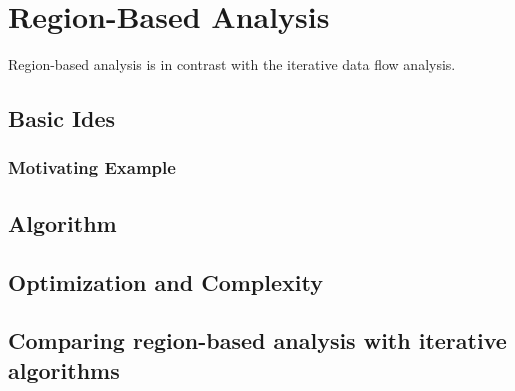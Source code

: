 \section{Region-Based Analysis}

Region-based analysis is in contrast with the iterative data flow analysis. 

\subsection{Basic Ides}


\subsubsection{Motivating Example}




\subsection{Algorithm}


\subsection{Optimization and Complexity}



\subsection{Comparing region-based analysis with iterative algorithms}


